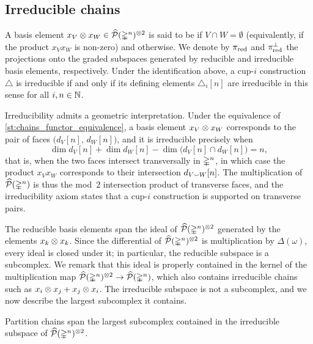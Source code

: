 \subsection{Irreducible chains}

A basis element $x_V \otimes x_W \in \widehat{\mathcal{P}}(\mathbb{\Delta}^n)^{\otimes 2}$ is said to be  if $V \cap W = \emptyset$ (equivalently, if the product $x_Vx_W$ is non-zero) and  otherwise.
We denote by $\operatorname{\pi_{\text{red}}}$ and $\operatorname{\pi^{\perp}_{\text{red}}}$ the projections onto the graded subspaces generated by reducible and irreducible basis elements, respectively.
Under the identification above, a cup-$i$ construction $\triangle$ is irreducible if and only if its defining elements $\triangle_i[n]$ are irreducible in this sense for all $i,n \in \mathbb{N}$.

\begin{remark}
	Irreducibility admits a geometric interpretation.
	Under the equivalence of \cref{st:chains_functor_equivalence}, a basis element $x_V \otimes x_W$ corresponds to the pair of faces $\big(d_V[n],\, d_W[n]\big)$, and it is irreducible precisely when
	\[
	\dim d_V[n] + \dim d_W[n] - \dim \big(d_V[n] \cap d_W[n]\big) = n,
	\]
	that is, when the two faces intersect transversally in $\mathbb{\Delta}^n$, in which case the product $x_V x_W$ corresponds to their intersection $d_{V \union W}[n]$.
	The multiplication of $\widehat{\mathcal{P}}(\mathbb{\Delta}^n)$ is thus the mod~$2$ intersection product of transverse faces, and the irreducibility axiom states that a \mbox{cup-$i$} construction is supported on transverse pairs.
\end{remark}

The reducible basis elements span the ideal of $\widehat{\mathcal{P}}(\mathbb{\Delta}^n)^{\otimes 2}$ generated by the elements $x_k \otimes x_k$.
Since the differential of $\widehat{\mathcal{P}}(\mathbb{\Delta}^n)^{\otimes 2}$ is multiplication by $\Delta(\omega)$, every ideal is closed under it; in particular, the reducible subspace is a subcomplex.
We remark that this ideal is properly contained in the kernel of the multiplication map $\widehat{\mathcal{P}}(\mathbb{\Delta}^n)^{\otimes 2} \to \widehat{\mathcal{P}}(\mathbb{\Delta}^n)$, which also contains irreducible chains such as $x_i \otimes x_j + x_j \otimes x_i$.
The irreducible subspace is not a subcomplex, and we now describe the largest subcomplex it contains.

\begin{theorem}\label{st:augmented_partition_subcomplex}
	Partition chains span the largest subcomplex contained in the irreducible subspace of $\widehat{\mathcal{P}}(\mathbb{\Delta}^n)^{\otimes 2}$.
\end{theorem}

